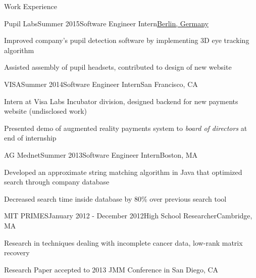 \documentclass{resume} %
\begin{document}
\begin{rSection}{Work Experience}

\begin{rSubsection}{Pupil Labs}{Summer 2015}{Software Engineer Intern}{\underline{Berlin, Germany}}
\item Improved company's pupil detection software by implementing 3D eye tracking algorithm
\item Assisted assembly of pupil headsets, contributed to design of new website
\end{rSubsection}


\begin{rSubsection}{VISA}{Summer 2014}{Software Engineer Intern}{San Francisco, CA}
\item Intern at Visa Labs Incubator division, designed backend for new payments website (undisclosed work)
\item Presented demo of augmented reality payments system to \emph{board of directors} at end of internship
\end{rSubsection}


\begin{rSubsection}{AG Mednet}{Summer 2013}{Software Engineer Intern}{Boston, MA}
\item Developed an approximate string matching algorithm in Java that optimized search through company database
\item Decreased search time inside database by 80\% over previous search tool
\end{rSubsection}


\begin{rSubsection}{MIT PRIMES}{January 2012 - December 2012}{High School Researcher}{Cambridge, MA}
\item Research in techniques dealing with incomplete cancer data, low-rank matrix recovery
\item Research Paper accepted to 2013 JMM Conference in San Diego, CA
\end{rSubsection}

\end{rSection}

\end{document}
